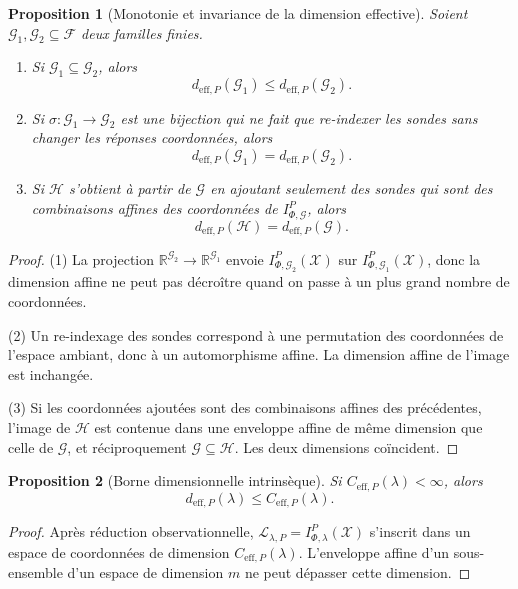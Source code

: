 \documentclass[11pt,a4paper]{article}
\newtheorem{proposition}{Proposition}
\begin{document}
\begin{proposition}[Monotonie et invariance de la dimension effective]
Soient \(\mathcal G_1,\mathcal G_2\subseteq\mathcal F\) deux familles finies.
\begin{enumerate}[label=\arabic*.]
\item Si \(\mathcal G_1\subseteq \mathcal G_2\), alors
\[
d_{\mathrm{eff},P}(\mathcal G_1)\le d_{\mathrm{eff},P}(\mathcal G_2).
\]
\item Si \(\sigma:\mathcal G_1\to\mathcal G_2\) est une bijection qui ne fait que re-indexer les sondes sans changer les réponses coordonnées, alors
\[
d_{\mathrm{eff},P}(\mathcal G_1)=d_{\mathrm{eff},P}(\mathcal G_2).
\]
\item Si \(\mathcal H\) s'obtient à partir de \(\mathcal G\) en ajoutant seulement des sondes qui sont des combinaisons affines des coordonnées de \(I_{\Phi,\mathcal G}^P\), alors
\[
d_{\mathrm{eff},P}(\mathcal H)=d_{\mathrm{eff},P}(\mathcal G).
\]
\end{enumerate}
\end{proposition}

\begin{proof}
(1) La projection \(\mathbb R^{\mathcal G_2}\to \mathbb R^{\mathcal G_1}\) envoie \(I_{\Phi,\mathcal G_2}^P(\mathcal X)\) sur \(I_{\Phi,\mathcal G_1}^P(\mathcal X)\), donc la dimension affine ne peut pas décroître quand on passe à un plus grand nombre de coordonnées.

(2) Un re-indexage des sondes correspond à une permutation des coordonnées de l'espace ambiant, donc à un automorphisme affine. La dimension affine de l'image est inchangée.

(3) Si les coordonnées ajoutées sont des combinaisons affines des précédentes, l'image de \(\mathcal H\) est contenue dans une enveloppe affine de même dimension que celle de \(\mathcal G\), et réciproquement \(\mathcal G\subseteq\mathcal H\). Les deux dimensions coïncident.
\end{proof}

\begin{proposition}[Borne dimensionnelle intrinsèque]
Si \(C_{\mathrm{eff},P}(\lambda)<\infty\), alors
\[
d_{\mathrm{eff},P}(\lambda)\le C_{\mathrm{eff},P}(\lambda).
\]
\end{proposition}

\begin{proof}
Après réduction observationnelle, \(\mathcal L_{\lambda,P}=I_{\Phi,\lambda}^P(\mathcal X)\) s'inscrit dans un espace de coordonnées de dimension \(C_{\mathrm{eff},P}(\lambda)\). L'enveloppe affine d'un sous-ensemble d'un espace de dimension \(m\) ne peut dépasser cette dimension.
\end{proof}
\end{document}
